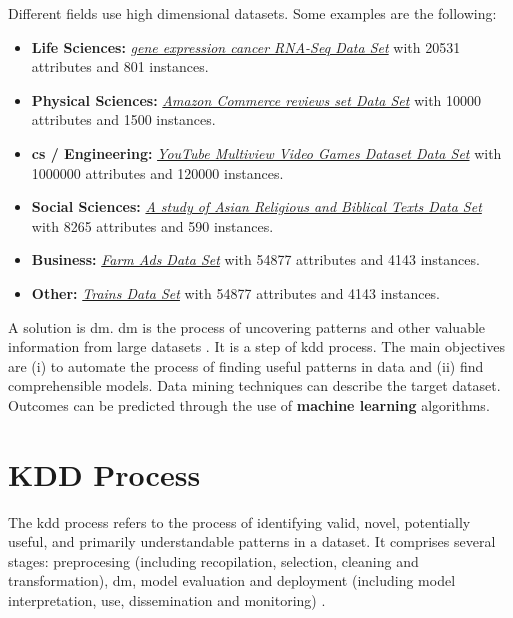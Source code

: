 Different fields use high dimensional datasets. Some examples \cite{Dua:2019} are the following:
\begin{itemize}
    \item \textbf{Life Sciences:} \href{http://archive.ics.uci.edu/ml/datasets/gene+expression+cancer+RNA-Seq}{\textit{gene expression cancer RNA-Seq Data Set}} with 20531 attributes and 801 instances.
    \item \textbf{Physical Sciences:} \href{http://archive.ics.uci.edu/ml/datasets/Amazon+Commerce+reviews+set}{\textit{Amazon Commerce reviews set Data Set}} with 10000 attributes and 1500 instances.
    \item \textbf{\acrshort{cs} / Engineering:} \href{http://archive.ics.uci.edu/ml/datasets/YouTube+Multiview+Video+Games+Dataset}{\textit{YouTube Multiview Video Games Dataset Data Set}} with 1000000 attributes and 120000 instances.
    \item \textbf{Social Sciences:} \href{http://archive.ics.uci.edu/ml/datasets/A+study+of++Asian+Religious+and+Biblical+Texts}{\textit{A study of Asian Religious and Biblical Texts Data Set}} with 8265 attributes and 590 instances.
    \item \textbf{Business:} \href{http://archive.ics.uci.edu/ml/datasets/Farm+Ads}{\textit{Farm Ads Data Set}} with 54877 attributes and 4143 instances.
    \item \textbf{Other:} \href{http://archive.ics.uci.edu/ml/datasets/Trains}{\textit{Trains Data Set}} with 54877 attributes and 4143 instances.
\end{itemize}

A solution is \acrfull{dm}. \acrshort{dm} is the process of uncovering patterns and other valuable information from large datasets \cite{data-mining}. It is a step of \acrfull{kdd} process. The main objectives are (i) to automate the process of finding useful patterns in data and (ii) find comprehensible models. Data  mining techniques can describe the target dataset. Outcomes can be predicted through the use of \textbf{machine learning} algorithms.

\section{KDD Process}
\label{sec:kdd-process}

The \acrlong{kdd} process refers to the process of identifying valid, novel, potentially useful, and primarily understandable patterns in a dataset. It comprises several stages: preprocesing (including recopilation, selection, cleaning and transformation), \acrlong{dm}, model evaluation and deployment (including model interpretation, use, dissemination and monitoring) \cite{Hernandez-Orallo05a}.

